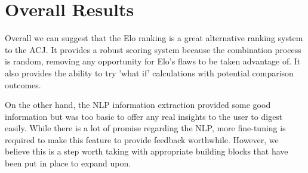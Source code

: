 \section{Overall Results}
\label{sec:reaults_NLP}

	Overall we can suggest that the Elo ranking is a great alternative ranking system to the ACJ. It provides a robust scoring system because the combination process is random, removing any opportunity for Elo's flaws to be taken advantage of. It also provides the ability to try 'what if' calculations with potential comparison outcomes.
	
	On the other hand, the NLP information extraction provided some good information but was too basic to offer any real insights to the user to digest easily. While there is a lot of promise regarding the NLP, more fine-tuning is required to make this feature to provide feedback worthwhile. However, we believe this is a step worth taking with appropriate building blocks that have been put in place to expand upon.

